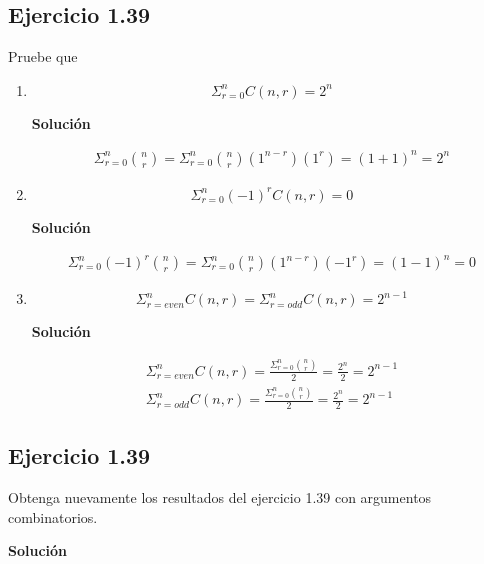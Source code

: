 \subsection*{Ejercicio 1.39}
Pruebe que 
\begin{enumerate}
	\item 
    \begin{equation*}
		\Sigma_{r=0}^nC(n,r)=2^n
    \end{equation*}

\textbf{Solución}

\begin{eqnarray*}
	\Sigma_{r=0}^{n} \binom{n}{r}=\Sigma_{r=0}^{n} \binom{n}{r}(1^{n-r})(1^r)=(1+1)^n=2^n
\end{eqnarray*}
	
    \item 
    \begin{equation*}
		\Sigma_{r=0}^n(-1)^rC(n,r)=0
	\end{equation*}

\textbf{Solución}

\begin{eqnarray*}
	\Sigma_{r=0}^{n} (-1)^r \binom{n}{r}=\Sigma_{r=0}^{n} \binom{n}{r}(1^{n-r})(-1^r)=(1-1)^n=0
\end{eqnarray*}

\item
\begin{equation*}
	\Sigma_{r=even}^nC(n,r)=\Sigma_{r=odd}^nC(n,r)=2^{n-1}
\end{equation*}

\textbf{Solución}

\begin{eqnarray*}
	\Sigma_{r=even}^nC(n,r)=\frac{\Sigma_{r=0}^{n} \binom{n}{r}}{2}=\frac{2^n}{2}=2^{n-1}\\
	\Sigma_{r=odd}^nC(n,r)=\frac{\Sigma_{r=0}^{n} \binom{n}{r}}{2}=\frac{2^n}{2}=2^{n-1}
\end{eqnarray*}
	
\end{enumerate}

\subsection*{Ejercicio 1.39}
Obtenga nuevamente los resultados del ejercicio 1.39 con argumentos combinatorios.

\textbf{Solución}

